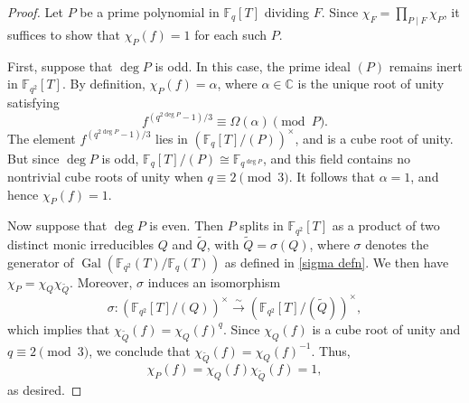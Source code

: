 \documentclass[table]{amsart}
\newcommand{\F}{\mathbb{F}}
\newcommand{\op}[1]{\operatorname{#1}}
\numberwithin{equation}{section}
\begin{document}
\begin{proof}
\par Let $P$ be a prime polynomial in $\F_q[T]$ dividing $F$. Since $\chi_F = \prod_{P \mid F} \chi_P$, it suffices to show that $\chi_P(f) = 1$ for each such $P$.
\par First, suppose that $\deg P$ is odd. In this case, the prime ideal $(P)$ remains inert in $\F_{q^2}[T]$. By definition, $\chi_P(f) = \alpha$, where $\alpha \in \mathbb{C}$ is the unique root of unity satisfying
$$
f^{(q^{2\deg P} - 1)/3} \equiv \Omega(\alpha) \pmod{P}.
$$
\noindent The element $f^{(q^{2\deg P} - 1)/3}$ lies in $\left( \F_q[T]/(P) \right)^\times$, and is a cube root of unity. But since $\deg P$ is odd, $\F_q[T]/(P) \cong \F_{q^{\deg P}}$, and this field contains no nontrivial cube roots of unity when $q \equiv 2 \pmod{3}$. It follows that $\alpha = 1$, and hence $\chi_P(f) = 1$.

\par Now suppose that $\deg P$ is even. Then $P$ splits in $\F_{q^2}[T]$ as a product of two distinct monic irreducibles $Q$ and $\widetilde{Q}$, with $\widetilde{Q} = \sigma(Q)$, where $\sigma$ denotes the generator of $\op{Gal}(\F_{q^2}(T)/\F_q(T))$ as defined in \eqref{sigma defn}. We then have $\chi_P = \chi_Q \chi_{\widetilde{Q}}$. Moreover, $\sigma$ induces an isomorphism
$$
\sigma : \left( \F_{q^2}[T]/(Q) \right)^\times \xrightarrow{\sim} \left( \F_{q^2}[T]/(\widetilde{Q}) \right)^\times,
$$
\noindent which implies that $\chi_{\widetilde{Q}}(f) = \chi_Q(f)^q$. Since $\chi_Q(f)$ is a cube root of unity and $q \equiv 2 \pmod{3}$, we conclude that $\chi_{\widetilde{Q}}(f) = \chi_Q(f)^{-1}$. Thus,
$$
\chi_P(f) = \chi_Q(f) \chi_{\widetilde{Q}}(f) = 1,
$$
as desired.

\end{proof}
\end{document}
